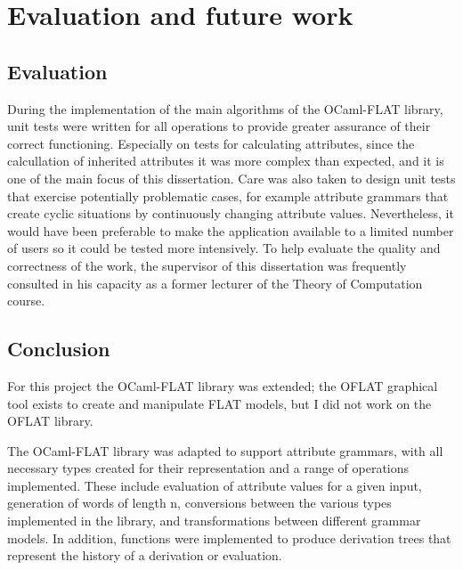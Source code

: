 
%

\chapter{Evaluation and future work}
\label{cha:Evaluation}


\section{Evaluation}
\label{sec:evaluation}

During the implementation of the main algorithms of the OCaml-FLAT library, unit tests were written for all operations to provide greater assurance of 
their correct functioning. Especially on tests for calculating attributes, since 
the calcullation of inherited attributes it was more complex than expected, and it is one of the main focus of this dissertation. 
Care was also taken to design unit tests that exercise potentially problematic cases, for example attribute grammars that create cyclic situations by 
continuously changing attribute values. Nevertheless, it would have been preferable to make the application available to a limited number of users so it 
could be tested more intensively. To help evaluate the quality and correctness of the work, the supervisor of this dissertation was frequently consulted 
in his capacity as a former lecturer of the Theory of Computation course.

\section{Conclusion}
\label{sec:conclusion}

For this project the OCaml-FLAT library was extended; the OFLAT graphical tool exists to create and manipulate FLAT models, but I did not work on 
the OFLAT library.

The OCaml-FLAT library was adapted to support attribute grammars, with all necessary types created for their representation and a range of operations 
implemented. These include evaluation of attribute values for a given input, generation of words of length n, conversions between the various types 
implemented in the library, and transformations between different grammar models. In addition, functions were implemented to produce derivation trees 
that represent the history of a derivation or evaluation.


